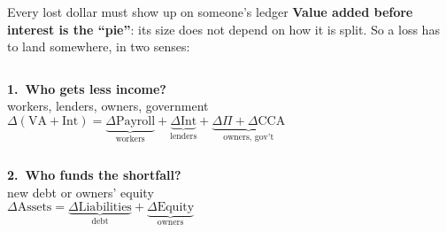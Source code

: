 \documentclass[aspectratio=169,11pt]{beamer}
\newcommand{\muted}[1]{{\color{CoolGray}#1}}
\newcommand{\hy}[1]{\textbf{\textcolor{SlateTeal}{#1}}}
\begin{document}
\begin{frame}[label=accounting]{Every lost dollar must show up on someone's ledger}
  \textbf{Value added before interest is the ``pie''}: its size does not depend on how it is split.
  So a loss has to land somewhere, in two senses:

  \vspace{10pt}
  \begin{columns}[c,onlytextwidth]
    \hy{1.\ Who gets less income?}\\
    {\small\muted{workers, lenders, owners, government}}
    \[
      \Delta(\text{VA}+\text{Int}) = \underbrace{\Delta \text{Payroll}}_{\text{workers}}
      + \underbrace{\Delta \text{Int}}_{\text{lenders}}
      + \underbrace{\Delta \Pi + \Delta \text{CCA}}_{\text{owners, gov't}}
    \]
  \end{columns}

  \vspace{8pt}
  \begin{columns}[c,onlytextwidth]
    \hy{2.\ Who funds the shortfall?}\\
    {\small\muted{new debt or owners' equity}}
    \[
      \Delta \text{Assets} = \underbrace{\Delta \text{Liabilities}}_{\text{debt}} + \underbrace{\Delta \text{Equity}}_{\text{owners}}
    \]
  \end{columns}
\end{frame}
\end{document}
